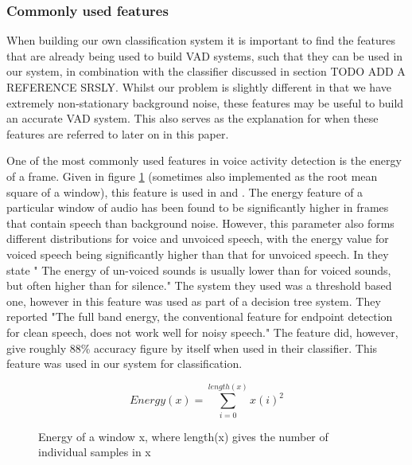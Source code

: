 \documentclass[ %
                    author={Sam Phippen},
                supervisor={Dr. Rafal Bogacz},
                     title={Real time voice activity detectors in noisy personal computing environments},
                  subtitle={},
                    degree={MEng},
                      year={2012} ]{thesis}
\begin{document}
\subsubsection{Commonly used features}

When building our own classification system it is important to find the
features that are already being used to build VAD systems, such that they can
be used in our system, in combination with the classifier discussed in section
TODO ADD A REFERENCE SRSLY. Whilst our problem is slightly different in that we
have extremely non-stationary background noise, these features may be useful to
build an accurate VAD system. This also serves as the explanation for when
these features are referred to later on in this paper.

One of the most commonly used features in voice activity detection is the
energy of a frame. Given in figure \ref{eqn:energy} (sometimes also implemented
as the root mean square of a window), this feature is used in
\cite{shin}\cite{sakhnov}\cite{gokhun}\cite{haigh}\cite{atal} and \cite{sohn2}.
The energy feature of a particular window of audio has been found to be
significantly higher in frames that contain speech than background
noise\cite{atal}. However, this parameter also forms different distributions
for voice and unvoiced speech, with the energy value for voiced speech being
significantly higher than that for unvoiced speech. In \cite{atal} they state "
The energy of un-voiced sounds is usually lower than for voiced sounds, but
often higher than for silence." The system they used was a threshold based one,
however in \cite{shin} this feature was used as part of a decision tree system.
They reported "The full band energy, the conventional feature for endpoint
detection for clean speech, does not work well for noisy speech." The feature
did, however, give roughly 88\% accuracy figure by itself when used in their
classifier. This feature was used in our system for classification.

\begin{figure}
    $$Energy(x) = \sum_{i=0}^{length(x)}x(i)^2$$
    \label{eqn:energy}
    \caption{Energy of a window x, where length(x) gives the number of individual
    samples in x}
\end{figure}
\end{document}
